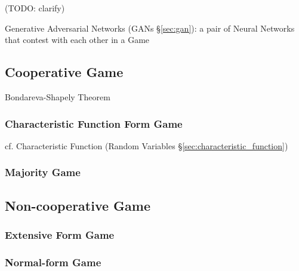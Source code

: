 (TODO: clarify)

\fist Generative Adversarial Networks (GANs \S\ref{sec:gan}): a pair of Neural
  Networks that contest with each other in a Game



\subsection{Cooperative Game}\label{sec:cooperative_game}

Bondareva-Shapely Theorem



\subsubsection{Characteristic Function Form Game}
\label{sec:characteristic_function_form}

cf. Characteristic Function (Random Variables
\S\ref{sec:characteristic_function})



\subsubsection{Majority Game}\label{sec:majority_game}



\subsection{Non-cooperative Game}\label{sec:noncooperative_game}

\subsubsection{Extensive Form Game}\label{sec:extensive_form_game}

\subsubsection{Normal-form Game}\label{sec:normal_form_game}



